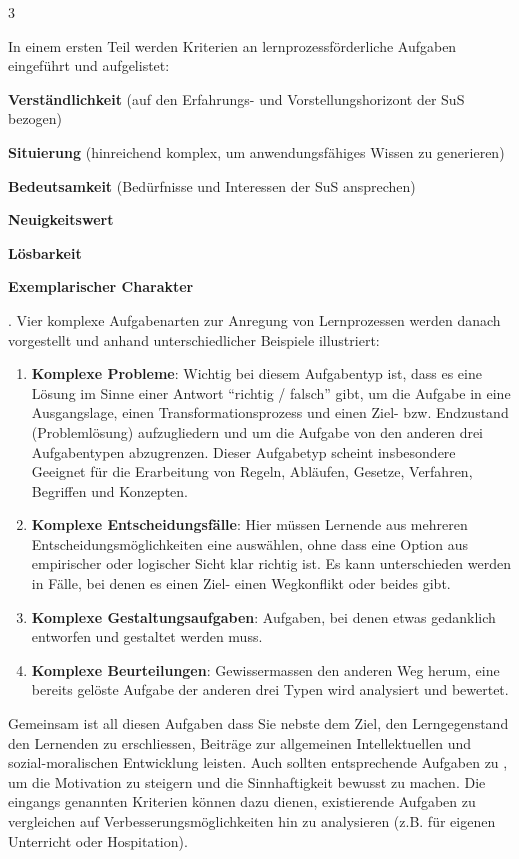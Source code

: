 \begin{landscape}
\begin{multicols*}{3}
    \begin{myBox}[title=\enquote{Gestaltung von Unterricht} \cite{tulo}]
      In einem ersten Teil werden Kriterien an lernprozessförderliche Aufgaben eingeführt und aufgelistet:
      \begin{enumerate*}
        \item \textbf{Verständlichkeit} (auf den Erfahrungs- und Vorstellungshorizont der SuS bezogen)
        \item \textbf{Situierung} (hinreichend komplex, um anwendungsfähiges Wissen zu generieren)
        \item \textbf{Bedeutsamkeit} (Bedürfnisse und Interessen der SuS ansprechen)
        \item \textbf{Neuigkeitswert}
        \item \textbf{Lösbarkeit}
        \item \textbf{Exemplarischer Charakter}
      \end{enumerate*}.
      Vier komplexe Aufgabenarten zur Anregung von Lernprozessen werden danach vorgestellt und anhand unterschiedlicher Beispiele illustriert:
      \begin{enumerate}
        \item \textbf{Komplexe Probleme}: Wichtig bei diesem Aufgabentyp ist, dass es eine Lösung im Sinne einer Antwort \enquote{richtig / falsch} gibt, um die Aufgabe in eine Ausgangslage, einen Transformationsprozess und einen Ziel- bzw. Endzustand (Problemlösung) aufzugliedern und um die Aufgabe von den anderen drei Aufgabentypen abzugrenzen. Dieser Aufgabetyp scheint insbesondere Geeignet für die Erarbeitung von Regeln, Abläufen, Gesetze, Verfahren, Begriffen und Konzepten.
        \item \textbf{Komplexe Entscheidungsfälle}: Hier müssen Lernende aus mehreren Entscheidungsmöglichkeiten eine auswählen, ohne dass eine Option aus empirischer oder logischer Sicht klar richtig ist. Es kann unterschieden werden in Fälle, bei denen es einen Ziel- einen Wegkonflikt oder beides gibt.
        \item \textbf{Komplexe Gestaltungsaufgaben}: Aufgaben, bei denen etwas gedanklich entworfen und gestaltet werden muss.
        \item \textbf{Komplexe Beurteilungen}: Gewissermassen den anderen Weg herum, eine bereits gelöste Aufgabe der anderen drei Typen wird analysiert und bewertet.
      \end{enumerate}
      Gemeinsam ist all diesen Aufgaben dass Sie nebste dem Ziel, den Lerngegenstand den Lernenden zu erschliessen, Beiträge zur allgemeinen Intellektuellen und sozial-moralischen Entwicklung leisten. Auch sollten entsprechende Aufgaben zu , um die Motivation zu steigern und die Sinnhaftigkeit bewusst zu machen. Die eingangs genannten Kriterien können dazu dienen, existierende Aufgaben zu vergleichen auf Verbesserungsmöglichkeiten hin zu analysieren (z.B. für eigenen Unterricht oder Hospitation).
    \end{myBox}
  \end{multicols*}
\end{landscape}
\newpage
\restoregeometry

